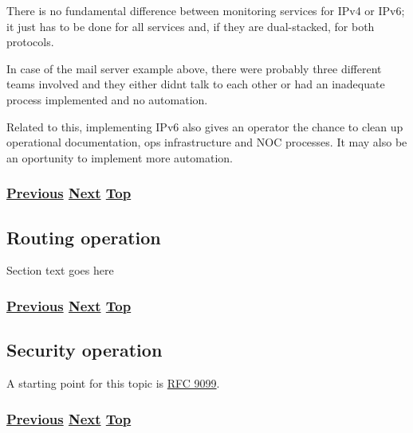 \documentclass[
]{article}
\begin{document}
There is no fundamental difference between monitoring services for IPv4
or IPv6; it just has to be done for all services and, if they are
dual-stacked, for both protocols.

In case of the mail server example above, there were probably three
different teams involved and they either didn\textquotesingle t talk to
each other or had an inadequate process implemented and no automation.

Related to this, implementing IPv6 also gives an operator the chance to
clean up operational documentation, ops infrastructure and NOC
processes. It may also be an oportunity to implement more automation.

\subsubsection{\texorpdfstring{\hyperref[remote-configuration]{Previous}
\hyperref[routing-operation]{Next}
\hyperref[management-and-operations]{Top}}{Previous Next Top}}\label{previous-next-top-27}

\pagebreak

\subsection{Routing operation}\label{routing-operation}

Section text goes here

\subsubsection{\texorpdfstring{\hyperref[benchmarking-and-monitoring]{Previous}
\hyperref[security-operation]{Next}
\hyperref[management-and-operations]{Top}}{Previous Next Top}}\label{previous-next-top-28}

\pagebreak

\subsection{Security operation}\label{security-operation}

A starting point for this topic is
\href{https://www.rfc-editor.org/info/rfc9099}{RFC 9099}.

\subsubsection{\texorpdfstring{\hyperref[routing-operation]{Previous}
\hyperref[multi-prefix-operation]{Next}
\hyperref[management-and-operations]{Top}}{Previous Next Top}}\label{previous-next-top-29}
\end{document}
